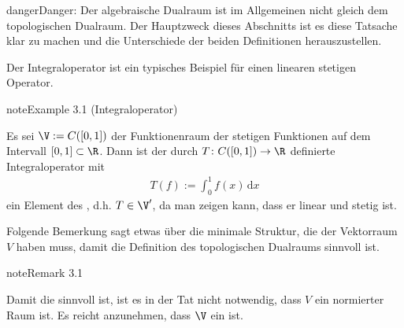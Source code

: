 \documentclass[letterpaper,10pt,english]{jupyterBook}
\begin{document}
\begin{sphinxadmonition}{danger}{Danger:}
\sphinxAtStartPar
Der algebraische Dualraum ist im Allgemeinen nicht gleich dem topologischen Dualraum.
Der Hauptzweck dieses Abschnitts ist es diese Tatsache klar zu machen und die Unterschiede der beiden Definitionen herauszustellen.
\end{sphinxadmonition}

\sphinxAtStartPar
Der Integraloperator ist ein typisches Beispiel für einen linearen stetigen Operator.
\label{vektoranalysis/multilinear:example-2}
\begin{sphinxadmonition}{note}{Example 3.1 (Integraloperator)}



\sphinxAtStartPar
Es sei \(\V := C([0,1])\) der Funktionenraum der stetigen Funktionen auf dem Intervall \([0,1] \subset \R\).
Dann ist der durch \(T \colon C([0,1]) \rightarrow \R\) definierte Integraloperator mit
\begin{equation*}
\begin{split}T(f) := \int_0^1 f(x) \, \mathrm{d}x\end{split}
\end{equation*}
\sphinxAtStartPar
ein Element des , d.h. \(T \in \V^\prime\), da man zeigen kann, dass er linear und stetig ist.
\end{sphinxadmonition}

\sphinxAtStartPar
Folgende Bemerkung sagt etwas über die minimale Struktur, die der Vektorraum \(V\) haben muss, damit die Definition des topologischen Dualraums sinnvoll ist.
\label{vektoranalysis/multilinear:remark-3}
\begin{sphinxadmonition}{note}{Remark 3.1}



\sphinxAtStartPar
Damit die {\hyperref[\detokenize{vektoranalysis/multilinear:def:topologischerDualraum}]{}} sinnvoll ist, ist es in der Tat nicht notwendig, dass \(V\) ein normierter Raum ist. Es reicht anzunehmen, dass \(\V\) ein  ist.
\end{sphinxadmonition}
\end{document}
